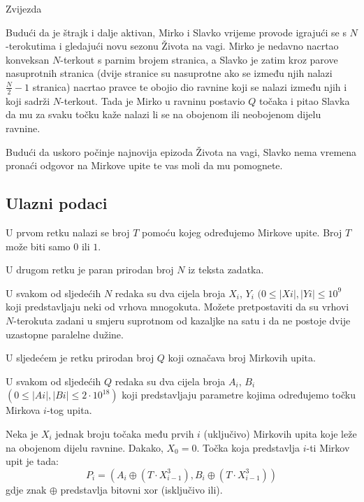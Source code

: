 \begin{statement}[
  problempoints=110,
  timelimit=1 sekunda,
  memorylimit=512 MiB,
]{Zvijezda}

Budući da je štrajk i dalje aktivan, Mirko i Slavko vrijeme provode igrajući se
s $N$-terokutima i gledajući novu sezonu Života na vagi. Mirko je nedavno
nacrtao konveksan $N$-terkout s parnim brojem stranica, a Slavko je zatim
kroz parove nasuprotnih stranica (dvije stranice su nasuprotne ako se između
njih nalazi $\frac{N}{2}-1$ stranica) nacrtao pravce te obojio dio ravnine
koji se nalazi između njih i koji sadrži $N$-terkout. Tada je Mirko u ravninu
postavio $Q$ točaka i pitao Slavka da mu za svaku točku kaže nalazi li se na
obojenom ili neobojenom dijelu ravnine.

Budući da uskoro počinje najnovija epizoda Života na vagi, Slavko nema vremena
pronaći odgovor na Mirkove upite te vas moli da mu pomognete.

\subsection*{Ulazni podaci}
U prvom retku nalazi se broj $T$ pomoću kojeg određujemo Mirkove upite. Broj
$T$ može biti samo $0$ ili $1$.

U drugom retku je paran prirodan broj $N$ iz teksta zadatka.

U svakom od sljedećih $N$ redaka su dva cijela broja $X_i$, $Y_i$
$(0 \le |Xi|, |Yi| \le 10^9$
koji predstavljaju neki od vrhova mnogokuta. Možete pretpostaviti
da su vrhovi $N$-terokuta zadani u smjeru suprotnom od kazaljke na satu i da ne
postoje dvije uzastopne paralelne dužine.

U sljedećem je retku prirodan broj $Q$ koji označava broj Mirkovih upita.

U svakom od sljedećih $Q$ redaka su dva cijela broja $A_i$, $B_i$
$(0 \le |Ai|, |Bi| \le 2\cdot10^{18})$ koji predstavljaju parametre kojima
određujemo točku Mirkova $i$-tog upita.

Neka je $X_i$ jednak broju točaka među prvih $i$ (uključivo) Mirkovih upita
koje leže na obojenom dijelu ravnine. Dakako, $X_0=0$. Točka koja predstavlja
$i$-ti Mirkov upit je tada:
\[P_i = (A_i \oplus (T \cdot X_{i-1}^{3}), B_i \oplus (T \cdot X_{i-1}^{3}))\]
gdje znak $\oplus$ predstavlja bitovni xor (isključivo ili).


\end{statement}
